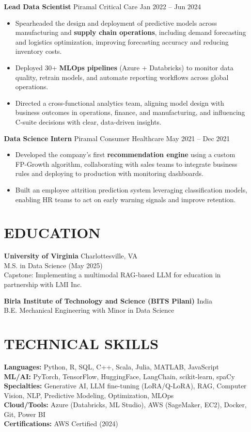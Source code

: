 \documentclass[letterpaper,11pt]{article}
\begin{document}
\textbf{Lead Data Scientist} \hfill Piramal Critical Care \quad Jan 2022 -- Jun 2024 \\
\begin{itemize}[leftmargin=*]
    \item Spearheaded the design and deployment of predictive models across manufacturing and \textbf{supply chain operations}, including demand forecasting and logistics optimization, improving forecasting accuracy and reducing inventory costs.
    \item Deployed 30+ \textbf{MLOps pipelines} (Azure + Databricks) to monitor data quality, retrain models, and automate reporting workflows across global operations.
    \item Directed a cross-functional analytics team, aligning model design with business outcomes in operations, finance, and manufacturing, and influencing C-suite decisions with clear, data-driven insights.
\end{itemize}

\textbf{Data Science Intern} \hfill Piramal Consumer Healthcare \quad May 2021 -- Dec 2021 \\
\begin{itemize}[leftmargin=*]
    \item Developed the company’s first \textbf{recommendation engine} using a custom FP-Growth algorithm, collaborating with sales teams to integrate business rules and deploying to production with monitoring dashboards.
    \item Built an employee attrition prediction system leveraging classification models, enabling HR teams to act on early warning signals and improve retention.
\end{itemize}

\section*{EDUCATION}
\textbf{University of Virginia} \hfill Charlottesville, VA \\
M.S. in Data Science \quad (May 2025) \\
Capstone: Implementing a multimodal RAG-based LLM for education in partnership with LMI Inc.  

\textbf{Birla Institute of Technology and Science (BITS Pilani)} \hfill India \\
B.E. Mechanical Engineering with Minor in Data Science

\section*{TECHNICAL SKILLS}
\textbf{Languages:} Python, R, SQL, C++, Scala, Julia, MATLAB, JavaScript \\
\textbf{ML/AI:} PyTorch, TensorFlow, HuggingFace, LangChain, scikit-learn, spaCy \\
\textbf{Specialties:} Generative AI, LLM fine-tuning (LoRA/Q-LoRA), RAG, Computer Vision, NLP, Predictive Modeling, Optimization, MLOps \\
\textbf{Cloud/Tools:} Azure (Databricks, ML Studio), AWS (SageMaker, EC2), Docker, Git, Power BI \\
\textbf{Certifications:} AWS Certified (2024)
\end{document}
